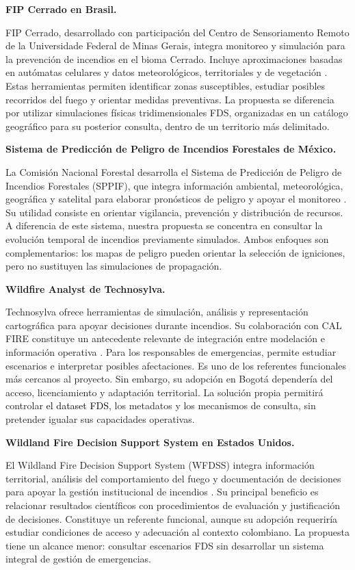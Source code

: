 \textbf{FIP Cerrado en Brasil.}

FIP Cerrado, desarrollado con participación del Centro de Sensoriamento Remoto de la Universidade Federal de Minas Gerais, integra monitoreo y simulación para la prevención de incendios en el bioma Cerrado. Incluye aproximaciones basadas en autómatas celulares y datos meteorológicos, territoriales y de vegetación \cite{vfpFIPCerrado}. Estas herramientas permiten identificar zonas susceptibles, estudiar posibles recorridos del fuego y orientar medidas preventivas. La propuesta se diferencia por utilizar simulaciones físicas tridimensionales FDS, organizadas en un catálogo geográfico para su posterior consulta, dentro de un territorio más delimitado.

\textbf{Sistema de Predicción de Peligro de Incendios Forestales de México.}

La Comisión Nacional Forestal desarrolla el Sistema de Predicción de Peligro de Incendios Forestales (SPPIF), que integra información ambiental, meteorológica, geográfica y satelital para elaborar pronósticos de peligro y apoyar el monitoreo \cite{vfpCONAFOR2026}. Su utilidad consiste en orientar vigilancia, prevención y distribución de recursos. A diferencia de este sistema, nuestra propuesta se concentra en consultar la evolución temporal de incendios previamente simulados. Ambos enfoques son complementarios: los mapas de peligro pueden orientar la selección de igniciones, pero no sustituyen las simulaciones de propagación.

\textbf{Wildfire Analyst de Technosylva.}

Technosylva ofrece herramientas de simulación, análisis y representación cartográfica para apoyar decisiones durante incendios. Su colaboración con CAL FIRE constituye un antecedente relevante de integración entre modelación e información operativa \cite{vfpTechnosylva}. Para los responsables de emergencias, permite estudiar escenarios e interpretar posibles afectaciones. Es uno de los referentes funcionales más cercanos al proyecto. Sin embargo, su adopción en Bogotá dependería del acceso, licenciamiento y adaptación territorial. La solución propia permitirá controlar \textcolor{black}{el dataset FDS}, los metadatos y los mecanismos de consulta, sin pretender igualar sus capacidades operativas.

\textbf{Wildland Fire Decision Support System en Estados Unidos.}

El Wildland Fire Decision Support System (WFDSS) integra información territorial, análisis del comportamiento del fuego y documentación de decisiones para apoyar la gestión institucional de incendios \cite{vfpWFDSS}. Su principal beneficio es relacionar resultados científicos con procedimientos de evaluación y justificación de decisiones. Constituye un referente funcional, aunque su adopción requeriría estudiar condiciones de acceso y adecuación al contexto colombiano. La propuesta tiene un alcance menor: consultar escenarios FDS sin desarrollar un sistema integral de gestión de emergencias.

